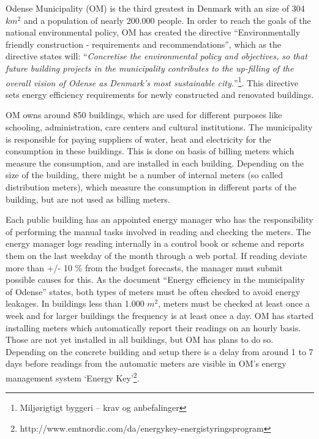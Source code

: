 Odense Municipality (OM) is the third greatest in Denmark with an size of 304 $km^2$ and a population of nearly 200.000 people. In order to reach the goals of the national environmental policy, OM has created the directive “Environmentally friendly construction - requirements and recommendations”,  which as the directive states will: “\emph{Concretise the environmental policy and objectives, so that future building projects in the municipality contributes to the up-filling of the overall vision of Odense as Denmark's most sustainable city.}”\footnote{Miljørigtigt byggeri – krav og anbefalinger}. This directive sets energy efficiency requirements for newly constructed and renovated buildings.

OM owns around 850 buildings, which are used for different purposes like schooling, administration, care centers and cultural institutions. The municipality is responsible for paying suppliers of water, heat and electricity for the consumption in these buildings. This is done on basis of billing meters which measure the consumption, and are installed in each building. Depending on the size of the building, there might be a number of internal meters (so called distribution meters), which measure the consumption in different parts of the building, but are not used as billing meters. 

Each public building has an appointed energy manager who has the responsibility of performing the manual tasks involved in reading and checking the meters. The energy manager logs reading internally in a control book or scheme and reports them on the last weekday of the month through a web portal. If reading deviate more than +/- 10 \% from the budget forecasts, the manager must submit possible causes for this. As the document “Energy efficiency in the municipality of Odense” states, both types of meters must be often checked to avoid energy leakages.  In buildings less than 1.000 $m^2$, meters must be checked at least once a week and for larger buildings the frequency is at least once a day. OM has started installing meters which automatically report their readings on an hourly basis. Those are not yet installed in all buildings, but OM has plans to do so. Depending on the concrete building and setup there is a delay from around 1 to 7 days before readings from the automatic meters are visible in OM’s energy management system ‘Energy Key’\footnote{http://www.emtnordic.com/da/energykey-energistyringsprogram}.

